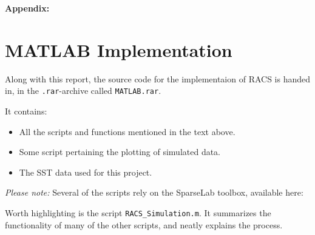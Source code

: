 \documentclass[Main]{subfiles}
\begin{document}
	
	{\LARGE \textbf{Appendix:}}

	\section{MATLAB Implementation} %
	\label{sec:matlab_implementation}

		Along with this report, the source code for the implementaion of RACS is handed in, in the \texttt{.rar}-archive called \texttt{MATLAB.rar}.

		It contains:
		\begin{itemize}
			\item All the scripts and functions mentioned in the text above.
			\item Some script pertaining the plotting of simulated data.
			\item The SST data used for this project.
		\end{itemize}

		\emph{Please note:} Several of the scripts rely on the SparseLab toolbox, available here: \cite{SparseLab:Online}

		Worth highlighting is the script \texttt{RACS\_Simulation.m}. It summarizes the functionality of many of the other scripts, and neatly explains the process.

	
\end{document}
